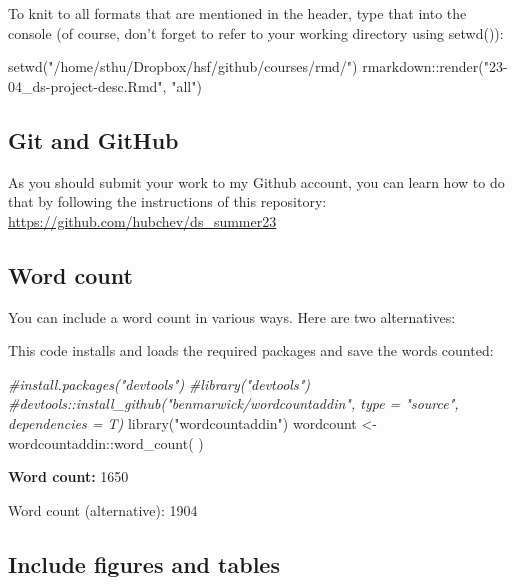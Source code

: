 \documentclass[
  12pt,
]{article}
\newenvironment{Shaded}{\begin{snugshade}}{\end{snugshade}}
\newcommand{\CommentTok}[1]{\textcolor[rgb]{0.56,0.35,0.01}{\textit{#1}}}
\newcommand{\FunctionTok}[1]{\textcolor[rgb]{0.00,0.00,0.00}{#1}}
\newcommand{\NormalTok}[1]{#1}
\newcommand{\OtherTok}[1]{\textcolor[rgb]{0.56,0.35,0.01}{#1}}
\newcommand{\SpecialCharTok}[1]{\textcolor[rgb]{0.00,0.00,0.00}{#1}}
\newcommand{\StringTok}[1]{\textcolor[rgb]{0.31,0.60,0.02}{#1}}
\begin{document}
To knit to all formats that are mentioned in the header, type that into the console (of course, don't forget to refer to your working directory using setwd()):

\begin{Shaded}
\begin{Highlighting}[]
\FunctionTok{setwd}\NormalTok{(}\StringTok{"/home/sthu/Dropbox/hsf/github/courses/rmd/"}\NormalTok{)}
\NormalTok{rmarkdown}\SpecialCharTok{::}\FunctionTok{render}\NormalTok{(}\StringTok{"23{-}04\_ds{-}project{-}desc.Rmd"}\NormalTok{, }\StringTok{"all"}\NormalTok{)}
\end{Highlighting}
\end{Shaded}

\hypertarget{git-and-github}{%
\subsection{Git and GitHub}\label{git-and-github}}

As you should submit your work to my Github account, you can learn how to do that by following the instructions of this repository: \url{https://github.com/hubchev/ds_summer23}

\hypertarget{word-count}{%
\subsection{Word count}\label{word-count}}

You can include a word count in various ways. Here are two alternatives:

This code installs and loads the required packages and save the words counted:

\begin{Shaded}
\begin{Highlighting}[]
\CommentTok{\#install.packages("devtools")}
\CommentTok{\#library("devtools")}
\CommentTok{\#devtools::install\_github("benmarwick/wordcountaddin", type = "source", dependencies = T)}
\FunctionTok{library}\NormalTok{(}\StringTok{"wordcountaddin"}\NormalTok{)}
\NormalTok{wordcount }\OtherTok{\textless{}{-}}\NormalTok{ wordcountaddin}\SpecialCharTok{::}\FunctionTok{word\_count}\NormalTok{( )}
\end{Highlighting}
\end{Shaded}

\textbf{Word count:} 1650

Word count (alternative): 1904

\hypertarget{include-figures-and-tables}{%
\subsection{Include figures and tables}\label{include-figures-and-tables}}
\end{document}
